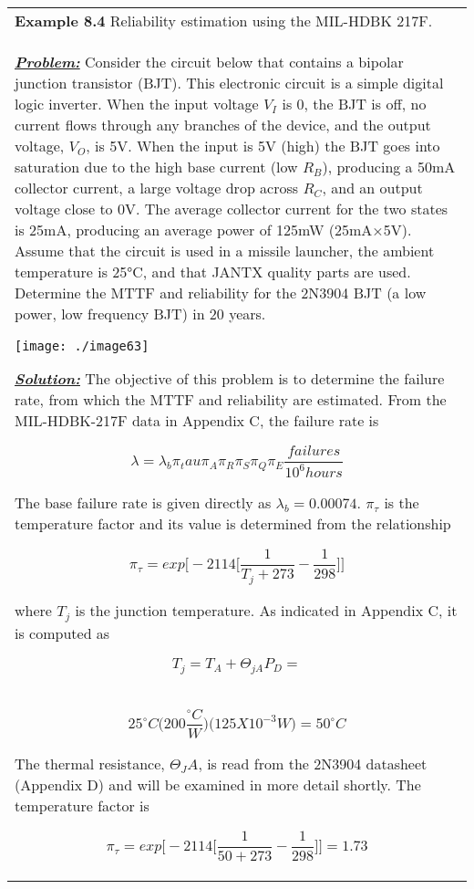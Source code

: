 \begin{table}
\begin{tabular}{m{15cm}|}
\textbf{\hfill\break Example 8.4}
Reliability estimation using the MIL-HDBK 217F. \\

\emph{\textbf{\ul{Problem:}}} Consider the circuit below that contains a
bipolar junction transistor (BJT). This electronic circuit is a simple
digital logic inverter. When the input voltage $V_I$ is 0, 
the BJT is off, no current
flows through any branches of the device, and the output voltage,
$V_O$, is 5V. When the input is 5V
(high) the BJT goes into saturation due to the high base current (low
$R_B$), producing a 50mA collector
current, a large voltage drop across $R_C$, and an output
voltage close to 0V. The average collector current for the two states is
25mA, producing an average power of 125mW (25mA×5V). Assume that the
circuit is used in a missile launcher, the ambient temperature is 25°C,
and that JANTX quality parts are used. Determine the MTTF and
reliability for the 2N3904 BJT (a low power, low frequency BJT) in 20
years.

\texttt{[image: ./image63]}


\emph{\textbf{\ul{Solution:}}} The objective of this problem is to
determine the failure rate, from which the MTTF and reliability are
estimated. From the MIL-HDBK-217F data in Appendix C, the failure rate
is


$$\lambda=\lambda_b \pi_tau \pi_A \pi_R \pi_S \pi_Q \pi_E \frac{failures}{10^6 hours}$$


The base failure rate is given directly as
$\lambda_b = 0.00074$.   $\pi_\tau$ is the temperature factor and
its value is determined from the relationship

$$\pi_\tau = exp \big[-2114 \big[ \frac{1}{T_j + 273} - \frac{1}{298} \big] \big]$$

where $T_j$ is the junction temperature. As
indicated in Appendix C, it is computed as

$$T_j = T_A + \Theta_{jA}P_D = $$ \\
$$		25^\circ C \big( 200 \frac{^\circ C}{W} \big) \big(125 X 10^{-3}W \big) = 50^\circ C $$

The thermal resistance, $\Theta_JA$, is read
from the 2N3904 datasheet (Appendix D) and will be examined in more
detail shortly. The temperature factor is

$$\pi_\tau = exp \big[-2114 \big[ \frac{1}{50 + 273} - \frac{1}{298} \big] \big] = 1.73$$


\end{tabular}
\end{table}
